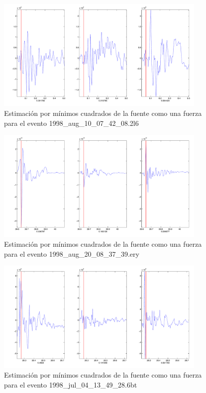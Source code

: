 \begin{figure}[H]
\includegraphics[width=0.9\textwidth,height=0.4\textheight]{linea_timerev/figuras/plotSrcEv4src.pdf}
\caption{Estimación por mínimos cuadrados de la fuente como una fuerza para el
evento 1998\_aug\_10\_07\_42\_08.2l6}
\end{figure}
\begin{figure}[H]
\includegraphics[width=0.9\textwidth,height=0.4\textheight]{linea_timerev/figuras/plotSrcEv5src.pdf}
\caption{Estimación por mínimos cuadrados de la fuente como una fuerza para el
evento 1998\_aug\_20\_08\_37\_39.ery}
\end{figure}
\begin{figure}[H]
\includegraphics[width=0.9\textwidth,height=0.4\textheight]{linea_timerev/figuras/plotSrcEv6src.pdf}
\caption{Estimación por mínimos cuadrados de la fuente como una fuerza para el
evento 1998\_jul\_04\_13\_49\_28.6bt}
\end{figure}
